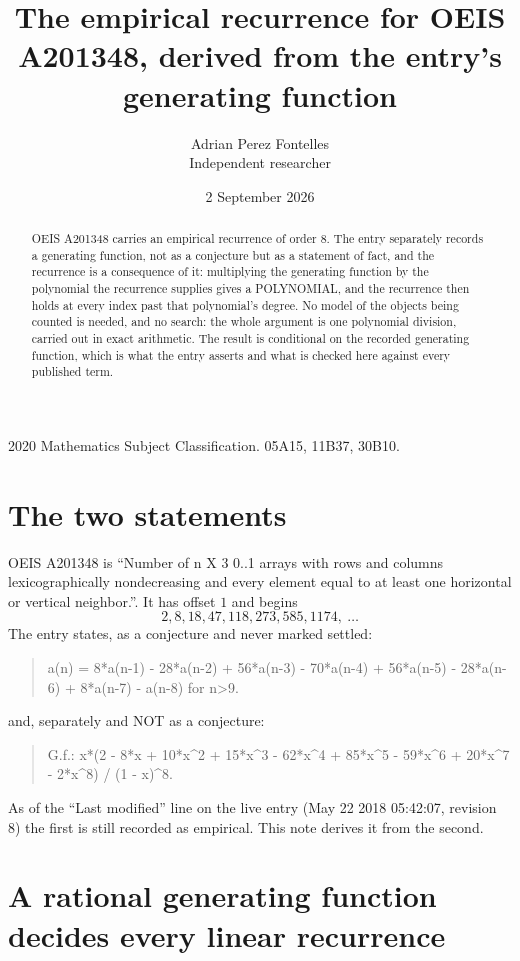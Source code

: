 \documentclass[11pt,a4paper]{article}
\title{The empirical recurrence for OEIS A201348, derived from the entry's generating function}
\author{Adrian Perez Fontelles\\ \small Independent researcher}
\date{2 September 2026}
\theoremstyle{plain}
\theoremstyle{definition}
\begin{document}
\maketitle

\begin{abstract}
OEIS A201348 carries an empirical recurrence of order $8$. The entry separately records a
generating function, not as a conjecture but as a statement of fact, and the recurrence is a
consequence of it: multiplying the generating function by the polynomial the recurrence
supplies gives a POLYNOMIAL, and the recurrence then holds at every index past that
polynomial's degree. No model of the objects being counted is needed, and no search: the
whole argument is one polynomial division, carried out in exact arithmetic. The result is
conditional on the recorded generating function, which is what the entry asserts and what is
checked here against every published term.
\end{abstract}

\noindent\small 2020 Mathematics Subject Classification. 05A15, 11B37, 30B10.\normalsize

\section{The two statements}

OEIS A201348 is ``Number of n X 3 0..1 arrays with rows and columns lexicographically nondecreasing and every element equal to at least one horizontal or vertical neighbor.''. It has offset $1$ and begins
\[
2, 8, 18, 47, 118, 273, 585, 1174,\ \dots
\]
The entry states, as a conjecture and never marked settled:
\begin{quote}
a(n) = 8*a(n-1) - 28*a(n-2) + 56*a(n-3) - 70*a(n-4) + 56*a(n-5) - 28*a(n-6) + 8*a(n-7) - a(n-8) for n>9.
\end{quote}
and, separately and NOT as a conjecture:
\begin{quote}
G.f.: x*(2 - 8*x + 10*x\^{}2 + 15*x\^{}3 - 62*x\^{}4 + 85*x\^{}5 - 59*x\^{}6 + 20*x\^{}7 - 2*x\^{}8) / (1 - x)\^{}8.
\end{quote}
As of the ``Last modified'' line on the live entry (May 22 2018 05:42:07, revision 8) the first is still
recorded as empirical. This note derives it from the second.

\section{A rational generating function decides every linear recurrence}
\end{document}
